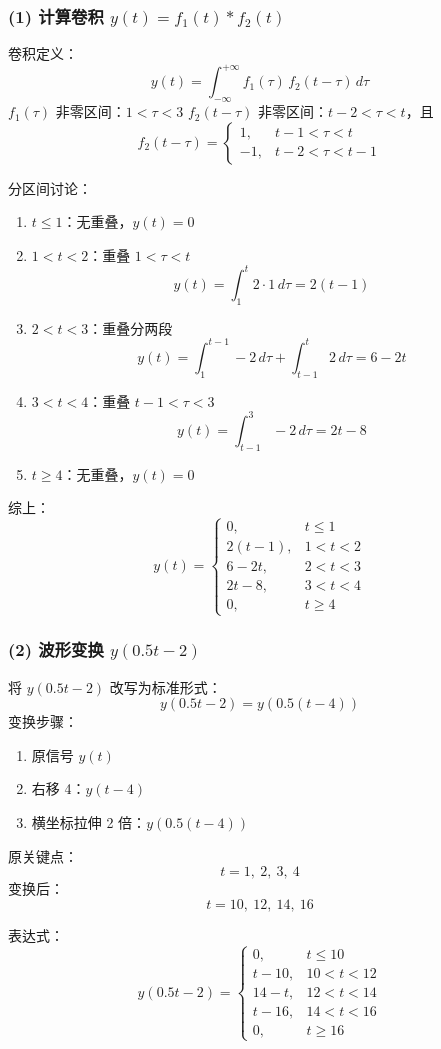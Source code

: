 \subsubsection{(1) 计算卷积 $y(t) = f_1(t)*f_2(t)$}
卷积定义：
\[
y(t) = \int_{-\infty}^{+\infty} f_1(\tau)\,f_2(t-\tau)\,d\tau
\]
$f_1(\tau)$ 非零区间：$1<\tau<3$
$f_2(t-\tau)$ 非零区间：$t-2<\tau<t$，且
\[
f_2(t-\tau)=
\begin{cases}
1, & t-1<\tau<t\\
-1, & t-2<\tau<t-1
\end{cases}
\]

分区间讨论：
\begin{enumerate}[itemsep=0.5ex]
    \item $t \le 1$：无重叠，$y(t)=0$
    \item $1 < t < 2$：重叠 $1<\tau<t$
    \[
    y(t) = \int_{1}^{t} 2\cdot 1\,d\tau = 2(t-1)
    \]
    \item $2 < t < 3$：重叠分两段
    \[
    y(t) = \int_{1}^{t-1}\!-2\,d\tau + \int_{t-1}^{t}\!2\,d\tau
          = 6-2t
    \]
    \item $3 < t < 4$：重叠 $t-1<\tau<3$
    \[
    y(t) = \int_{t-1}^{3}\!-2\,d\tau = 2t-8
    \]
    \item $t \ge 4$：无重叠，$y(t)=0$
\end{enumerate}

综上：
\[
y(t) =
\begin{cases}
0, & t \leq 1 \\
2(t-1), & 1 < t < 2 \\
6 - 2t, & 2 < t < 3 \\
2t - 8, & 3 < t < 4 \\
0, & t \geq 4
\end{cases}
\]

\subsubsection{(2) 波形变换 $y(0.5t-2)$}
将 $y(0.5t-2)$ 改写为标准形式：
\[
y(0.5t-2) = y\left(0.5(t-4)\right)
\]
变换步骤：
\begin{enumerate}
    \item 原信号 $y(t)$
    \item 右移 4：$y(t-4)$
    \item 横坐标拉伸 2 倍：$y(0.5(t-4))$
\end{enumerate}

原关键点：
\[
t=1,\ 2,\ 3,\ 4
\]
变换后：
\[
t=10,\ 12,\ 14,\ 16
\]

表达式：
\[
y(0.5t-2) =
\begin{cases}
0, & t \leq 10 \\
t-10, & 10 < t < 12 \\
14-t, & 12 < t < 14 \\
t-16, & 14 < t < 16 \\
0, & t \geq 16
\end{cases}
\]